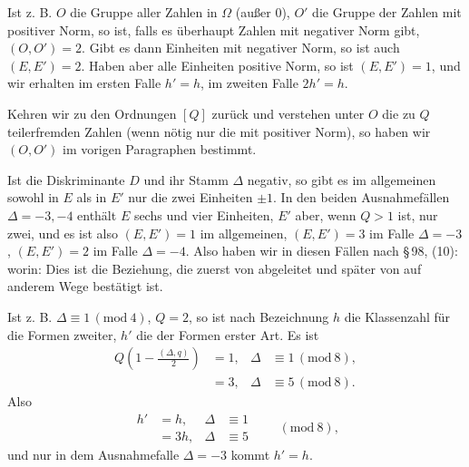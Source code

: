 
Ist z. B. $O$ die Gruppe aller Zahlen in $\Omega$ (au\ss er 0), $O'$ die Gruppe der Zahlen mit positiver Norm, so ist, falls es \"uberhaupt Zahlen mit negativer Norm gibt, $(O, O') = 2$. Gibt es dann Einheiten mit negativer Norm, so ist auch $(E, E') = 2$. Haben aber alle Einheiten positive Norm, so ist $(E, E') = 1$, und wir erhalten im ersten Falle $h' = h$, im zweiten Falle $2h' = h$.


Kehren wir zu den Ordnungen $[Q]$ zur\"uck und verstehen unter $O$ die zu $Q$ teilerfremden Zahlen (wenn n\"otig nur die mit positiver Norm), so haben wir $(O, O')$ im vorigen Paragraphen bestimmt.

Ist die Diskriminante $D$ und ihr Stamm $\Delta$ negativ, so gibt es im allgemeinen sowohl in $E$ als in $E'$ nur die zwei Einheiten $\pm 1$. In den beiden Ausnahmef\"allen $\Delta = -3, -4$ enth\"alt $E$ sechs und vier Einheiten, $E'$ aber, wenn $Q > 1$ ist, nur zwei, und es ist also $(E, E') = 1$ im allgemeinen, $(E, E') = 3$ im Falle $\Delta = -3$, $(E, E') = 2$ im Falle $\Delta = -4$. Also haben wir in diesen F\"allen nach \S\,98, (10):
worin:
Dies ist die Beziehung, die zuerst von  abgeleitet und sp\"ater von  auf anderem Wege best\"atigt ist.

Ist z. B. $\Delta \equiv 1 \, (\mathrm{mod}\ 4)$, $Q = 2$, so ist nach  Bezeichnung $h$ die Klassenzahl f\"ur die Formen zweiter, $h'$ die der Formen erster Art. Es ist
\[
\begin{aligned}
Q\left(1 - \frac{(\Delta, q)}{2}\right) &= 1, & \Delta &\equiv 1 \, (\mathrm{mod}\ 8), \\
&= 3, & \Delta &\equiv 5 \, (\mathrm{mod}\ 8).
\end{aligned}
\]
Also
\[
\begin{aligned}
h' &= h, & \Delta &\equiv 1 \\
&= 3h, & \Delta &\equiv 5
\end{aligned}
\qquad (\mathrm{mod}\ 8),
\]
und nur in dem Ausnahmefalle $\Delta = -3$ kommt $h' = h$.
